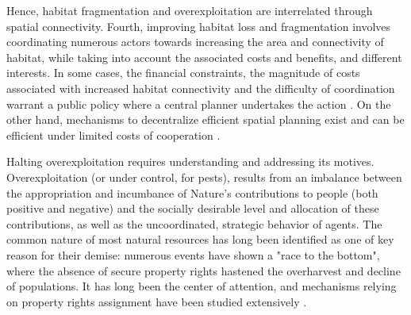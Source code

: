  Hence, habitat fragmentation and overexploitation are interrelated through spatial connectivity. Fourth, improving habitat loss and fragmentation involves coordinating numerous actors towards increasing the area and connectivity of habitat, while taking into account the associated costs and benefits, and different interests.
 In some cases, the financial constraints, the magnitude of costs associated with increased habitat connectivity and the difficulty of coordination warrant a public policy where a central planner undertakes the action \citep{Mouysset2012}. On the other hand, mechanisms to decentralize efficient spatial planning exist and can be efficient under limited costs of cooperation \citep{costello_private_2017, bareille_agglomeration_2023}. 
 
	Halting overexploitation requires understanding and addressing its motives. Overexploitation (or under control, for pests), results from an imbalance between the appropriation and incumbance of Nature's contributions to people (both positive and negative) and the socially desirable level and allocation of these contributions, as well as the uncoordinated, strategic behavior of agents. 	
	The common nature of most natural resources \citep{Gordon1954, smith_models_1969} has long been identified as one of key reason for their demise: numerous events have shown a "race to the bottom", where the absence of secure property rights hastened the overharvest and decline of populations. It has long been the center of attention, and mechanisms relying on property rights assignment have been studied extensively \citep{libecap_tragedy_2009, costello_partial_2015, isaksen_tragedy_2019}.\\
	
